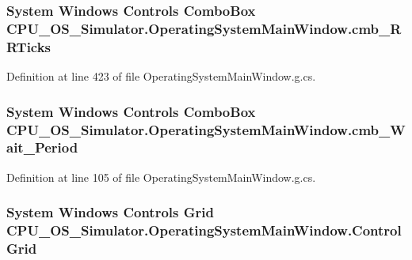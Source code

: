 \subsubsection[{cmb\+\_\+\+R\+R\+Ticks}]{\setlength{\rightskip}{0pt plus 5cm}System Windows Controls Combo\+Box C\+P\+U\+\_\+\+O\+S\+\_\+\+Simulator.\+Operating\+System\+Main\+Window.\+cmb\+\_\+\+R\+R\+Ticks\hspace{0.3cm}{\ttfamily [package]}}\label{class_c_p_u___o_s___simulator_1_1_operating_system_main_window_a599d396665359bf3ff8c1a9a9e220229}


Definition at line 423 of file Operating\+System\+Main\+Window.\+g.\+cs.

\hypertarget{class_c_p_u___o_s___simulator_1_1_operating_system_main_window_a4da0c086d71c3b794c9cd816aafeac88}{}
\subsubsection[{cmb\+\_\+\+Wait\+\_\+\+Period}]{\setlength{\rightskip}{0pt plus 5cm}System Windows Controls Combo\+Box C\+P\+U\+\_\+\+O\+S\+\_\+\+Simulator.\+Operating\+System\+Main\+Window.\+cmb\+\_\+\+Wait\+\_\+\+Period\hspace{0.3cm}{\ttfamily [package]}}\label{class_c_p_u___o_s___simulator_1_1_operating_system_main_window_a4da0c086d71c3b794c9cd816aafeac88}


Definition at line 105 of file Operating\+System\+Main\+Window.\+g.\+cs.

\hypertarget{class_c_p_u___o_s___simulator_1_1_operating_system_main_window_a8214613c45a89010009e4c3cca7e36f3}{}
\subsubsection[{Control\+Grid}]{\setlength{\rightskip}{0pt plus 5cm}System Windows Controls Grid C\+P\+U\+\_\+\+O\+S\+\_\+\+Simulator.\+Operating\+System\+Main\+Window.\+Control\+Grid\hspace{0.3cm}{\ttfamily [package]}}\label{class_c_p_u___o_s___simulator_1_1_operating_system_main_window_a8214613c45a89010009e4c3cca7e36f3}


